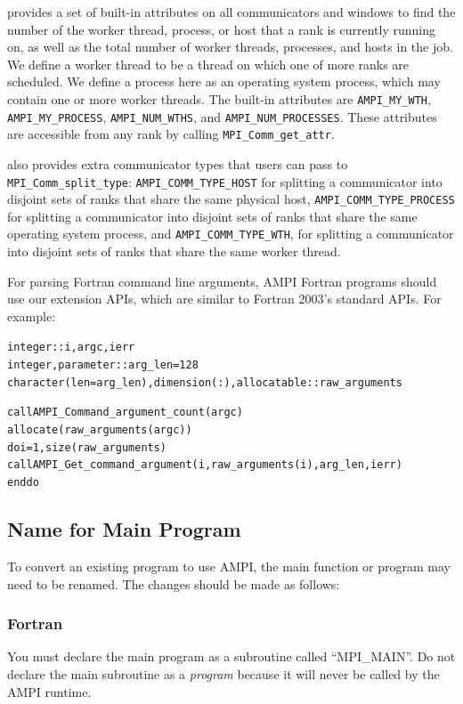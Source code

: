 \documentclass[10pt]{article}
\begin{document}
\ampi{} provides a set of built-in attributes on all communicators and windows
to find the number of the worker thread, process, or host that a rank is currently running on,
as well as the total number of worker threads, processes, and hosts in the job.
We define a worker thread to be a thread on which one of more \ampi{} ranks are scheduled.
We define a process here as an operating system process, which may contain one or more
worker threads. The built-in attributes are \texttt{AMPI\_MY\_WTH}, \texttt{AMPI\_MY\_PROCESS},
\texttt{AMPI\_NUM\_WTHS}, and \texttt{AMPI\_NUM\_PROCESSES}. These attributes are
accessible from any rank by calling \texttt{MPI\_Comm\_get\_attr}.

\ampi{} also provides extra communicator types that users can pass to
\texttt{MPI\_Comm\_split\_type}: \texttt{AMPI\_COMM\_TYPE\_HOST} for splitting a communicator into
disjoint sets of ranks that share the same physical host, \texttt{AMPI\_COMM\_TYPE\_PROCESS} for
splitting a communicator into disjoint sets of ranks that share the same operating system process,
and \texttt{AMPI\_COMM\_TYPE\_WTH}, for splitting a communicator into disjoint sets
of ranks that share the same worker thread.

For parsing Fortran command line arguments, AMPI Fortran programs should use
our extension APIs, which are similar to Fortran 2003's standard APIs. For example:

\begin{alltt}
integer :: i, argc, ierr
integer, parameter :: arg_len = 128
character(len=arg_len), dimension(:), allocatable :: raw_arguments

call AMPI_Command_argument_count(argc)
allocate(raw_arguments(argc))
do i = 1, size(raw_arguments)
    call AMPI_Get_command_argument(i, raw_arguments(i), arg_len, ierr)
end do
\end{alltt}

\subsection{Name for Main Program}

To convert an existing program to use AMPI, the main function or program
may need to be renamed. The changes should be made as follows:

\subsubsection{Fortran}

You must declare the main program as a subroutine called ``MPI\_MAIN''. 
Do not declare the main subroutine as a \textit{program} because 
it will never be called by the AMPI runtime.
\end{document}
